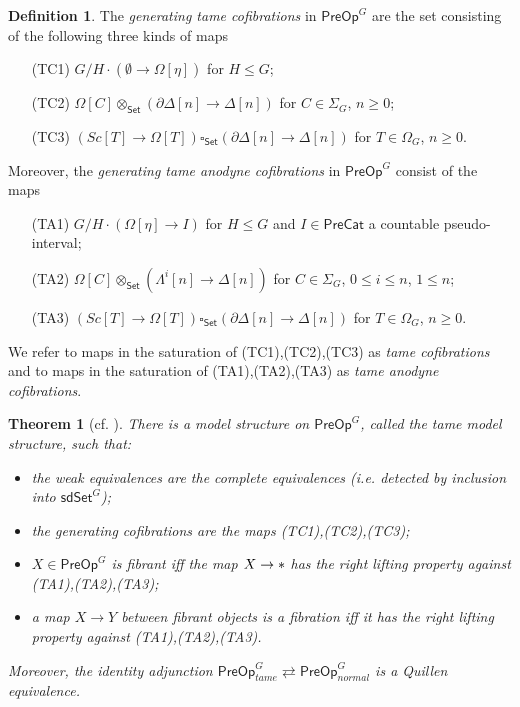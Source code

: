 \documentclass[a4paper,10pt
,draft
]{article}%
\numberwithin{equation}{section}
\numberwithin{figure}{section}
\newtheorem{theorem}[equation]{Theorem}%
\theoremstyle{definition} %
\newtheorem{definition}[equation]{Definition}%
\newcommand{\1}{\ensuremath{\mathbbm 1}}%
\begin{document}
\begin{definition}\label{TAMEGENMAP DEF}
	The \emph{generating tame cofibrations} in $\mathsf{PreOp}^G$
	are the set consisting of the following three kinds of maps
\begin{itemize}
	\item[(TC1)] $G/H \cdot \left(\emptyset \to\Omega[\eta]\right)$ for $H\leq G$;
	\item[(TC2)] $\Omega[C] \otimes_{\mathsf{Set}} \left(\partial \Delta[n] \to \Delta[n]\right)$ for $C \in \Sigma_G$, $n \geq 0$;
	\item[(TC3)] 
	$\left( Sc[T] \to \Omega[T] \right) 
	\square_{\mathsf{Set}} 
	\left(\partial \Delta[n] \to \Delta[n]\right)$ for $T \in \Omega_G$, $n \geq 0$.
\end{itemize}
	Moreover, the \emph{generating tame anodyne cofibrations} in $\mathsf{PreOp}^G$ consist of the maps
\begin{itemize}
	\item[(TA1)] $G/H \cdot 
	\left(\Omega[\eta] \to I \right)$ for $H \leq G$
	and $I \in \mathsf{PreCat}$
	a countable pseudo-interval;
	\item[(TA2)] $\Omega[C] \otimes_{\mathsf{Set}}\left(\Lambda^i[n] \to \Delta[n]\right)$ for $C \in \Sigma_G$, $0 \leq i \leq n$, $1 \leq n$;
	\item[(TA3)] 
	$\left( Sc[T] \to \Omega[T] \right) 
	\square_{\mathsf{Set}} 
	\left(\partial \Delta[n] \to \Delta[n]\right)$ for $T \in \Omega_G$, $n \geq 0$.
\end{itemize}
We refer to maps in the saturation of (TC1),(TC2),(TC3)
as \emph{tame cofibrations}
and to maps in the saturation of (TA1),(TA2),(TA3)
as \emph{tame anodyne cofibrations}.
\end{definition}




\begin{theorem}[{cf. \cite[Thm. 7.19]{CM13b}}]\label{TAMEMS_THM}
	There is a model structure on 
	$\mathsf{PreOp}^G$,
	called the \emph{tame model structure},
	such that:
\begin{itemize}
	\item the weak equivalences are the complete equivalences (i.e. detected by inclusion into 
		$\mathsf{sdSet}^G$);
	\item the generating cofibrations are the maps (TC1),(TC2),(TC3);
	\item $X \in \mathsf{PreOp}^G$ is fibrant iff
	the map $X \to \**$ has the right lifting property against 
	(TA1),(TA2),(TA3);
	\item a map $X \to Y$ between fibrant objects is a fibration iff
it has the right lifting property against 
(TA1),(TA2),(TA3).
\end{itemize}
Moreover, the identity adjunction
$
\mathsf{PreOp}^G_{tame} 
\rightleftarrows
\mathsf{PreOp}^G_{normal} 
$
is a Quillen equivalence.
\end{theorem}
\end{document}
